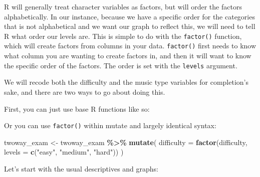 \documentclass[
]{book}
\newenvironment{Shaded}{\begin{snugshade}}{\end{snugshade}}
\newcommand{\AttributeTok}[1]{\textcolor[rgb]{0.13,0.29,0.53}{#1}}
\newcommand{\FunctionTok}[1]{\textcolor[rgb]{0.13,0.29,0.53}{\textbf{#1}}}
\newcommand{\NormalTok}[1]{#1}
\newcommand{\OtherTok}[1]{\textcolor[rgb]{0.56,0.35,0.01}{#1}}
\newcommand{\SpecialCharTok}[1]{\textcolor[rgb]{0.81,0.36,0.00}{\textbf{#1}}}
\newcommand{\StringTok}[1]{\textcolor[rgb]{0.31,0.60,0.02}{#1}}
\begin{document}
R will generally treat character variables as factors, but will order the factors alphabetically. In our instance, because we have a specific order for the categories that is not alphabetical and we want our graph to reflect this, we will need to tell R what order our levels are. This is simple to do with the \texttt{factor()} function, which will create factors from columns in your data. \texttt{factor()} first needs to know what column you are wanting to create factors in, and then it will want to know the specific order of the factors. The order is set with the \texttt{levels} argument.

We will recode both the difficulty and the music type variables for completion's sake, and there are two ways to go about doing this.

First, you can just use base R functions like so:

\begin{Shaded}
\end{Shaded}

Or you can use \texttt{factor()} within mutate and largely identical syntax:

\begin{Shaded}
\begin{Highlighting}[]
\NormalTok{twoway\_exam }\OtherTok{\textless{}{-}}\NormalTok{ twoway\_exam }\SpecialCharTok{\%\textgreater{}\%}
  \FunctionTok{mutate}\NormalTok{(}
    \AttributeTok{difficulty =} \FunctionTok{factor}\NormalTok{(difficulty, }\AttributeTok{levels =} \FunctionTok{c}\NormalTok{(}\StringTok{"easy"}\NormalTok{, }\StringTok{"medium"}\NormalTok{, }\StringTok{"hard"}\NormalTok{))}
\NormalTok{  )}
\end{Highlighting}
\end{Shaded}

Let's start with the usual descriptives and graphs:
\end{document}
